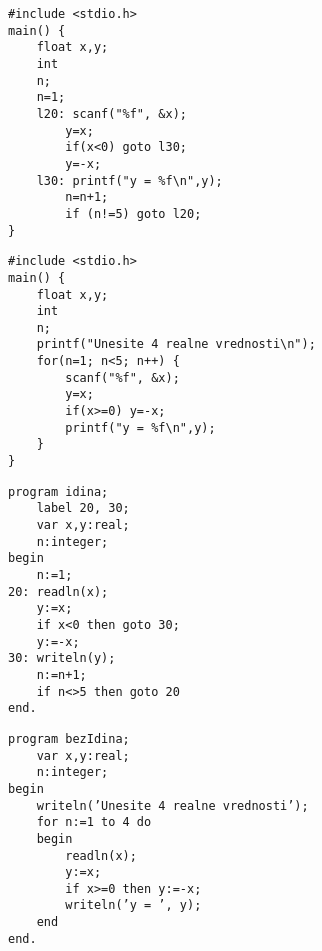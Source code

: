 \documentclass[../main.tex]{subfiles}
\begin{document}
\begin{multicols}{2}
\begin{boxprimer}
\begin{Verbatim}
#include <stdio.h>
main() {
    float x,y;
    int
    n;
    n=1;
    l20: scanf("%f", &x);
        y=x;
        if(x<0) goto l30;
        y=-x;
    l30: printf("y = %f\n",y);
        n=n+1;
        if (n!=5) goto l20;
}
\end{Verbatim}
\end{boxprimer}

\begin{boxprimer}
\begin{Verbatim}
#include <stdio.h>
main() {
    float x,y;
    int
    n;
    printf("Unesite 4 realne vrednosti\n");
    for(n=1; n<5; n++) {
        scanf("%f", &x);
        y=x;
        if(x>=0) y=-x;
        printf("y = %f\n",y);
    }
}
\end{Verbatim}
\end{boxprimer}

\begin{boxprimer}
\begin{Verbatim}
program idina;
    label 20, 30;
    var x,y:real;
    n:integer;
begin
    n:=1;
20: readln(x);
    y:=x;
    if x<0 then goto 30;
    y:=-x;
30: writeln(y);
    n:=n+1;
    if n<>5 then goto 20
end.
\end{Verbatim}
\end{boxprimer}

\begin{boxprimer}
\begin{Verbatim}
program bezIdina;
    var x,y:real;
    n:integer;
begin
    writeln(’Unesite 4 realne vrednosti’);
    for n:=1 to 4 do
    begin
        readln(x);
        y:=x;
        if x>=0 then y:=-x;
        writeln(’y = ’, y);
    end
end.
\end{Verbatim}
\end{boxprimer}
\end{multicols}
\end{document}
